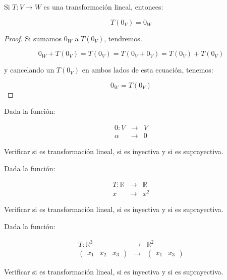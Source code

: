 		\begin{proposicion}
			Si $T \colon V \to W$ es una transformación lineal, entonces:

			\begin{equation}
				T(0_V) = 0_W
			\end{equation}
		\end{proposicion}

		\begin{proof}
			Si sumamos $0_W$ a $T(0_V)$, tendremos.

			\begin{equation*}
				0_W + T(0_V) = T(0_V) = T(0_V + 0_V) = T(0_V) + T(0_V)
			\end{equation*}

			y cancelando un $T(0_V)$ en ambos lados de esta ecuación, tenemos:

			\begin{equation*}
				0_W = T(0_V)
			\end{equation*}
		\end{proof}

		\begin{ejercicio}
			Dada la función:

			\begin{eqnarray*}
				0 \colon V & \to & V \\
				\alpha & \to & 0
			\end{eqnarray*}

			Verificar si es transformación lineal, si es inyectiva y si es suprayectiva.
		\end{ejercicio}

		\begin{ejercicio}
			Dada la función:

			\begin{eqnarray*}
				T \colon \mathbb{R} & \to & \mathbb{R} \\
				x & \to & x^2
			\end{eqnarray*}

			Verificar si es transformación lineal, si es inyectiva y si es suprayectiva.
		\end{ejercicio}

		\begin{ejercicio}
			Dada la función:

			\begin{eqnarray*}
				T \colon \mathbb{R}^3 & \to & \mathbb{R}^2 \\
				\begin{pmatrix} x_1 & x_2 & x_3 \end{pmatrix} & \to & \begin{pmatrix} x_1 & x_3 \end{pmatrix}
			\end{eqnarray*}

			Verificar si es transformación lineal, si es inyectiva y si es suprayectiva.
		\end{ejercicio}

